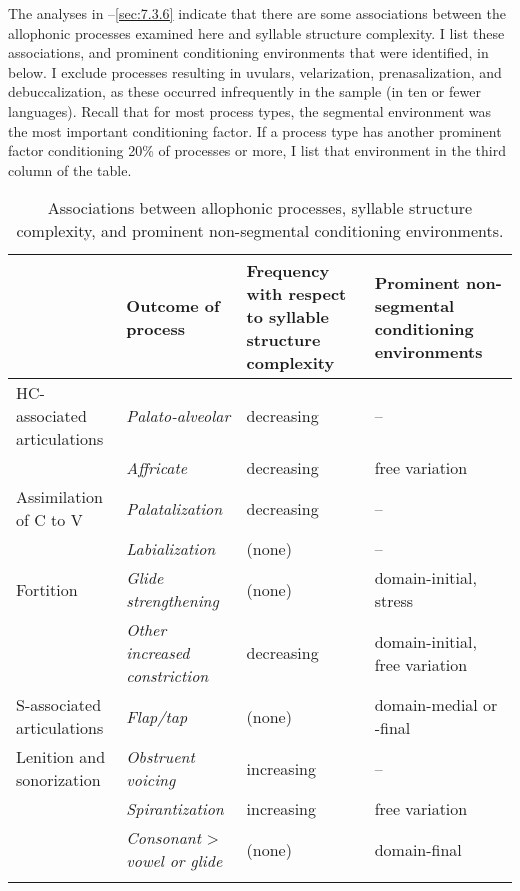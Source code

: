   The analyses in --\ref{sec:7.3.6} indicate that there are some associations between the allophonic processes examined here and syllable structure complexity. I list these associations, and prominent conditioning environments that were identified, in  below. I exclude processes resulting in uvulars, velarization, prenasalization, and debuccalization, as these occurred infrequently in the sample (in ten or fewer languages). Recall that for most process types, the segmental environment was the most important conditioning factor. If a process type has another prominent factor conditioning 20\% of processes or more, I list that environment in the third column of the table.

\begin{sidewaystable}
\begin{tabularx}{\textwidth}{lQQQ}
\lsptoprule
 & Outcome of process & Frequency with respect to syllable structure complexity & Prominent non-segmental conditioning environments\\\midrule
HC-associated articulations & \textit{Palato-alveolar} & decreasing & --\\
 & \textit{Affricate} & decreasing & free variation\\\tablevspace
Assimilation of C to V & \textit{Palatalization} & decreasing & --\\
 & \textit{Labialization} & (none) & --\\\tablevspace
Fortition & \textit{Glide strengthening} & (none) & domain-initial, stress\\
& \textit{Other increased constriction} & decreasing & domain-initial, free variation\\\tablevspace
S-associated articulations & \textit{Flap/tap} & (none) & domain-medial or -final\\\tablevspace
Lenition and sonorization & \textit{Obstruent voicing} & increasing & --\\
& \textit{Spirantization} & increasing & free variation\\
& \textit{Consonant} > \textit{vowel or glide} & (none) & domain-final\\
\lspbottomrule
\end{tabularx}
\caption{\label{tab:7.7}Associations between allophonic processes, syllable structure complexity, and prominent non-segmental conditioning environments.}
\end{sidewaystable}

